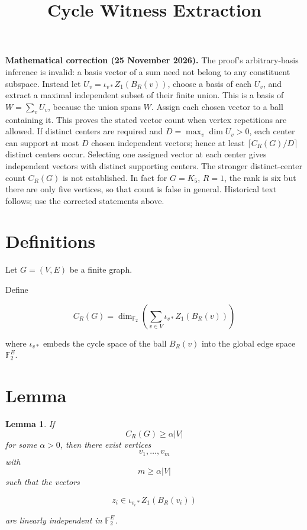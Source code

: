 \documentclass{article}
\newtheorem{lemma}{Lemma}
\begin{document}
\title{Cycle Witness Extraction}
\date{}
\maketitle
\par\noindent\textbf{Mathematical correction (25 November 2026).} The proof's arbitrary-basis inference is invalid: a basis vector of a sum need not belong to any constituent subspace. Instead let $U_v=\iota_{v*}Z_1(B_R(v))$, choose a basis of each $U_v$, and extract a maximal independent subset of their finite union. This is a basis of $W=\sum_v U_v$, because the union spans $W$. Assign each chosen vector to a ball containing it. This proves the stated vector count when vertex repetitions are allowed. If distinct centers are required and $D=\max_v\dim U_v>0$, each center can support at most $D$ chosen independent vectors; hence at least $\lceil C_R(G)/D\rceil$ distinct centers occur. Selecting one assigned vector at each center gives independent vectors with distinct supporting centers. The stronger distinct-center count $C_R(G)$ is not established. In fact for $G=K_5$, $R=1$, the rank is six but there are only five vertices, so that count is false in general. Historical text follows; use the corrected statements above.\par


\section*{Definitions}

Let $G=(V,E)$ be a finite graph.

Define

\[
C_R(G)
=
\dim_{\mathbb F_2}
\left(
\sum_{v\in V}\iota_{v*}Z_1(B_R(v))
\right)
\]

where $\iota_{v*}$ embeds the cycle space of the ball $B_R(v)$
into the global edge space $\mathbb F_2^{E}$.

\section*{Lemma}

\begin{lemma}
If
\[
C_R(G) \ge \alpha |V|
\]
for some $\alpha>0$, then there exist vertices
\[
v_1,\dots,v_m
\]
with
\[
m \ge \alpha |V|
\]
such that the vectors

\[
z_i \in \iota_{v_i*}Z_1(B_R(v_i))
\]

are linearly independent in $\mathbb F_2^{E}$.
\end{lemma}
\end{document}
